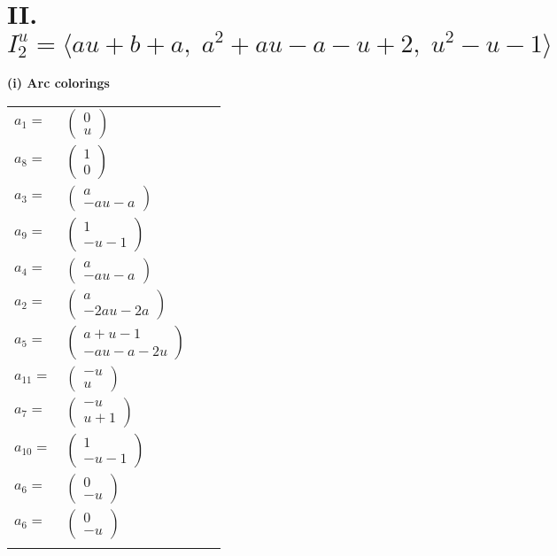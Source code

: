 \documentclass[1p]{elsarticle_modified}
\theoremstyle{definition}
\begin{document}
\centering \section*{II. $I^u_{2}= \langle a u+b+a,\;a^2+a u- a- u+2,\;u^2- u-1 \rangle$}
\flushleft \textbf{(i) Arc colorings}\\
\begin{tabular}{m{7pt} m{180pt} m{7pt} m{180pt} }
\flushright $a_{1}=$&$\begin{pmatrix}0\\u\end{pmatrix}$ \\
\flushright $a_{8}=$&$\begin{pmatrix}1\\0\end{pmatrix}$ \\
\flushright $a_{3}=$&$\begin{pmatrix}a\\- a u- a\end{pmatrix}$ \\
\flushright $a_{9}=$&$\begin{pmatrix}1\\- u-1\end{pmatrix}$ \\
\flushright $a_{4}=$&$\begin{pmatrix}a\\- a u- a\end{pmatrix}$ \\
\flushright $a_{2}=$&$\begin{pmatrix}a\\-2 a u-2 a\end{pmatrix}$ \\
\flushright $a_{5}=$&$\begin{pmatrix}a+u-1\\- a u- a-2 u\end{pmatrix}$ \\
\flushright $a_{11}=$&$\begin{pmatrix}- u\\u\end{pmatrix}$ \\
\flushright $a_{7}=$&$\begin{pmatrix}- u\\u+1\end{pmatrix}$ \\
\flushright $a_{10}=$&$\begin{pmatrix}1\\- u-1\end{pmatrix}$ \\
\flushright $a_{6}=$&$\begin{pmatrix}0\\- u\end{pmatrix}$\\ \flushright $a_{6}=$&$\begin{pmatrix}0\\- u\end{pmatrix}$\\&\end{tabular}
\end{document}
